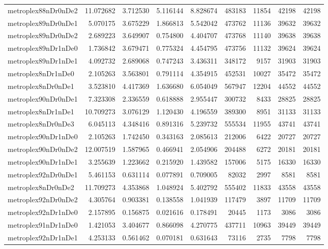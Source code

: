 \begin{longtable}{|l|r|r|r|r|r|r|r|r|}
metroplex88nDr0nDe2 & 11.072682 & 3.712530 & 5.116144 & 8.828674 & 483183 & 11854 & 42198 & 42198 \\
metroplex89nDr0nDe1 & 5.070175 & 3.675229 & 1.866813 & 5.542042 & 473762 & 11136 & 39632 & 39632 \\
metroplex89nDr0nDe2 & 2.689223 & 3.649907 & 0.754800 & 4.404707 & 473768 & 11140 & 39638 & 39638 \\
metroplex89nDr1nDe0 & 1.736842 & 3.679471 & 0.775324 & 4.454795 & 473756 & 11132 & 39624 & 39624 \\
metroplex89nDr1nDe1 & 4.092732 & 2.689068 & 0.747243 & 3.436311 & 348172 & 9157 & 31903 & 31903 \\
metroplex8nDr1nDe0 & 2.105263 & 3.563801 & 0.791114 & 4.354915 & 452531 & 10027 & 35472 & 35472 \\
metroplex8nDr0nDe1 & 3.523810 & 4.417369 & 1.636680 & 6.054049 & 567947 & 12204 & 44552 & 44552 \\
metroplex90nDr0nDe1 & 7.323308 & 2.336559 & 0.618888 & 2.955447 & 300732 & 8433 & 28825 & 28825 \\
metroplex8nDr1nDe1 & 10.709273 & 3.076129 & 1.120430 & 4.196559 & 389300 & 8951 & 31133 & 31133 \\
metroplex8nDr0nDe3 & 6.045113 & 4.348416 & 0.891316 & 5.239732 & 555534 & 11955 & 43741 & 43741 \\
metroplex90nDr1nDe0 & 2.105263 & 1.742450 & 0.343163 & 2.085613 & 212006 & 6422 & 20727 & 20727 \\
metroplex90nDr0nDe2 & 12.007519 & 1.587965 & 0.466941 & 2.054906 & 204488 & 6272 & 20181 & 20181 \\
metroplex90nDr1nDe1 & 3.255639 & 1.223662 & 0.215920 & 1.439582 & 157006 & 5175 & 16330 & 16330 \\
metroplex92nDr0nDe1 & 5.461153 & 0.631114 & 0.077891 & 0.709005 & 82032 & 2997 & 8581 & 8581 \\
metroplex8nDr0nDe2 & 11.709273 & 4.353868 & 1.048924 & 5.402792 & 555402 & 11833 & 43558 & 43558 \\
metroplex92nDr0nDe2 & 4.305764 & 0.903381 & 0.138558 & 1.041939 & 117479 & 3897 & 11709 & 11709 \\
metroplex92nDr1nDe0 & 2.157895 & 0.156875 & 0.021616 & 0.178491 & 20445 & 1173 & 3086 & 3086 \\
metroplex91nDr1nDe0 & 1.421053 & 3.404677 & 0.866098 & 4.270775 & 437711 & 10963 & 39449 & 39449 \\
metroplex92nDr1nDe1 & 4.253133 & 0.561462 & 0.070181 & 0.631643 & 73116 & 2735 & 7798 & 7798 \\

\end{longtable}
